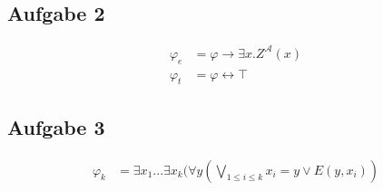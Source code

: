 \documentclass[a4paper,10pt]{article}
\begin{document}
\subsection*{Aufgabe 2}
\begin{align*}
	\varphi_e &= \varphi \rightarrow \exists x.Z^{\mathcal{A}}(x) \\ 
	\varphi_t &= \varphi \leftrightarrow \top
\end{align*}

\subsection*{Aufgabe 3}
\begin{align*}
	\varphi_k &= \exists x_1...\exists x_k(\forall y( \bigvee_{1 \le i \le k} x_i = y \lor E(y,x_i))
\end{align*}
\end{document}
